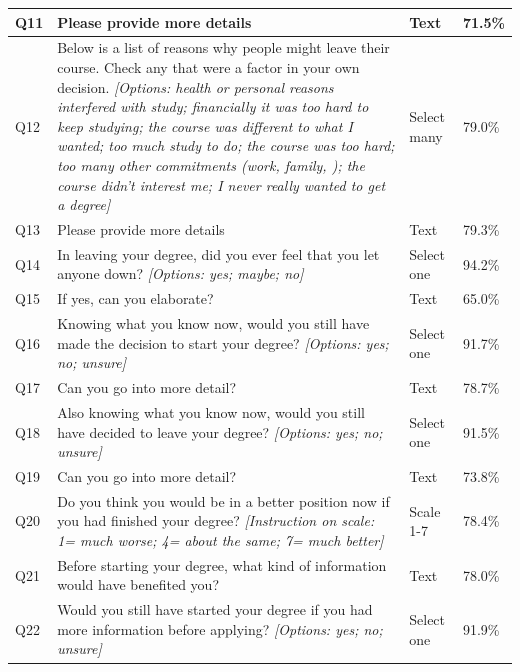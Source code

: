 \begin{longtable}{p{.7cm}p{18.6cm}p{2cm}p{2cm}}
        \midrule
        Q11   & Please provide more details & Text  & 71.5\% \\
        \midrule
        Q12   & Below is a list of reasons why people might leave their course. Check any that were a factor in your own decision. \newline \textit{[Options: health or personal reasons interfered with study; financially it was too hard to keep studying; the course was different to what I wanted; too much study to do; the course was too hard; too many other commitments (work, family, \etc{}); the course didn't interest me; I never really wanted to get a degree]} & Select many & 79.0\% \\
        \midrule
        Q13   & Please provide more details & Text  & 79.3\% \\
        \midrule
        Q14   & In leaving your degree, did you ever feel that you let anyone down? \newline \textit{[Options: yes; maybe; no]} & Select one & 94.2\% \\
        \midrule
        Q15   & If yes, can you elaborate? & Text  & 65.0\% \\
        \midrule
        Q16   & Knowing what you know now, would you still have made the decision to start your degree? \newline \textit{[Options: yes; no; unsure]} & Select one & 91.7\% \\
        \midrule
        Q17   & Can you go into more detail? & Text  & 78.7\% \\
        \midrule
        Q18   & Also knowing what you know now, would you still have decided to leave your degree? \newline \textit{[Options: yes; no; unsure]} & Select one & 91.5\% \\
        \midrule
        Q19   & Can you go into more detail? & Text  & 73.8\% \\
        \midrule
        Q20   & Do you think you would be in a better position now if you had finished your degree? \newline \textit{[Instruction on scale: 1= much worse; 4= about the same; 7= much better]} & Scale 1-7 & 78.4\% \\
        \midrule
        Q21   & Before starting your degree, what kind of information would have benefited you? & Text  & 78.0\% \\
        \midrule
        Q22   & Would you still have started your degree if you had more information before applying? \newline \textit{[Options: yes; no; unsure]} & Select one & 91.9\% \\

\end{longtable}
